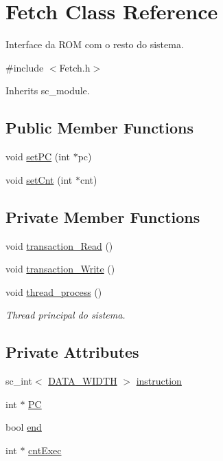 \hypertarget{classFetch}{\section{Fetch Class Reference}
\label{classFetch}
}


Interface da R\+O\+M com o resto do sistema.  




{\ttfamily \#include $<$Fetch.\+h$>$}



Inherits sc\+\_\+module.

\subsection*{Public Member Functions}
\begin{DoxyCompactItemize}
\item 
void \hyperlink{classFetch_af5532f59af4faa4b22abe5c818e54775}{set\+P\+C} (int $\ast$pc)
\item 
void \hyperlink{classFetch_aabf17d2c69db4926534637e6d45a75f5}{set\+Cnt} (int $\ast$cnt)
\end{DoxyCompactItemize}
\subsection*{Private Member Functions}
\begin{DoxyCompactItemize}
\item 
void \hyperlink{classFetch_a2201a1cd5048111b9f7bc7266964e0fb}{transaction\+\_\+\+Read} ()
\item 
void \hyperlink{classFetch_a4f2066d5330459037444ecb2a063f1da}{transaction\+\_\+\+Write} ()
\item 
void \hyperlink{classFetch_a5df8ae654e8d6a679a31f69bee65c7f0}{thread\+\_\+process} ()
\begin{DoxyCompactList}\small\item\em Thread principal do sistema. \end{DoxyCompactList}\end{DoxyCompactItemize}
\subsection*{Private Attributes}
\begin{DoxyCompactItemize}
\item 
sc\+\_\+int$<$ \hyperlink{Defines_8h_af087b76f9707be9d3b43ba0c782c31c3}{D\+A\+T\+A\+\_\+\+W\+I\+D\+T\+H} $>$ \hyperlink{classFetch_ab7c97d2c0dab91563c0f33ba6c6a4cb0}{instruction}
\item 
int $\ast$ \hyperlink{classFetch_a843f7a6498d7c4049751f8e7267f6609}{P\+C}
\item 
bool \hyperlink{classFetch_ae42d76542792425cdd2b896b4558cb8b}{end}
\item 
int $\ast$ \hyperlink{classFetch_a9598888b1bb54bf4946efe56639279d8}{cnt\+Exec}
\end{DoxyCompactItemize}


